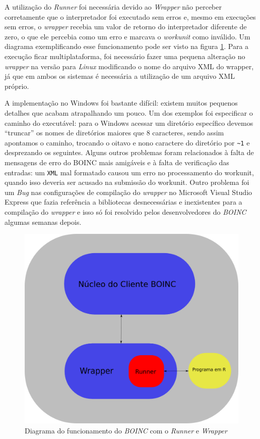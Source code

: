A utilização do \emph{Runner} foi necessária devido ao \emph{Wrapper} não perceber corretamente
que o interpretador foi executado sem erros e, mesmo em execuções sem erros, o \emph{wrapper} 
recebia um valor de retorno do interpretador diferente de zero, o que ele percebia como um erro
e marcava o \emph{workunit} como inválido. Um diagrama exemplificando esse funcionamento pode ser visto 
na figura \ref{diagrama-boinc-wrapper-windows}. Para a execução ficar multiplataforma, foi necessário 
fazer uma pequena alteração no \emph{wrapper} na versão para \emph{Linux} modificando o nome do
arquivo XML do wrapper, já que em ambos os sistemas é necessária a utilização de um arquivo XML próprio.


A implementação no Windows foi bastante difícil: existem muitos pequenos detalhes que acabam
atrapalhando um pouco. Um dos exemplos foi especificar o caminho do executável: para o Windows acessar
um diretório específico devemos ``truncar'' os nomes de diretórios maiores que $8$ caracteres, sendo 
assim apontamos o caminho, trocando o oitavo e nono caractere do diretório por \verb#~1# 
e desprezando os seguintes. 
Alguns outros problemas foram relacionados à falta de mensagens de erro do BOINC mais amigáveis e
à falta de verificação das entradas: um \verb#XML# mal formatado causou um erro  no processamento
do workunit, quando isso deveria ser acusado na submissão do workunit. Outro problema foi um \emph{Bug}
nas configurações de compilação do \emph{wrapper} no Microsoft Visual Studio Express %
que fazia referência a bibliotecas desnecessárias e inexistentes para a compilação do \emph{wrapper}
e isso só foi resolvido pelos desenvolvedores do \emph{BOINC} algumas semanas depois. 


\begin{figure}[!h]
  \centering
  \includegraphics[scale=0.3]{boinc-diagram-runner.png}
  \caption{Diagrama do funcionamento do \emph{BOINC} com o \emph{Runner} e \emph{Wrapper}}
  \label{diagrama-boinc-wrapper-windows}
\end{figure}
 

